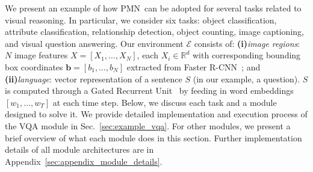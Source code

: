 \documentclass{article}
\makeatletter
\newcommand{\SK}[1]{{\color{NavyBlue}{[@Seung: #1]}}}
\def\PMN{PMN}
\def\E{\mathcal{E}}
\makeatother
\begin{document}
We present an example of how \PMN~can be adopted for several tasks related to visual reasoning.
In particular, we consider six tasks: object classification, attribute classification, relationship detection, object counting, image captioning, and visual question answering.
Our environment $\E$ consists of:
{\bf (i)}\emph{image regions}: $N$ image features $X=[X_1, \ldots, X_N]$, each $X_i \in \mathbb{R}^{d}$ with corresponding bounding box coordinates $\mathbf{b}=[b_1, \ldots, b_N]$ extracted from Faster R-CNN~\citep{ren15}; and
{\bf (ii)}\emph{language}: vector representation of a sentence $S$ (in our example, a question).
$S$ is computed through a Gated Recurrent Unit~\citep{cho14} by feeding in word embeddings $[w_1,\ldots,w_T]$ at each time step.
Below, we discuss each task and a module designed to solve it.
We provide detailed implementation and execution process of the VQA module in Sec.~\ref{sec:example_vqa}.
For other modules, we present a brief overview of what each module does in this section.
Further implementation details of all module architectures are in Appendix~\ref{sec:appendix_module_details}.
\end{document}
